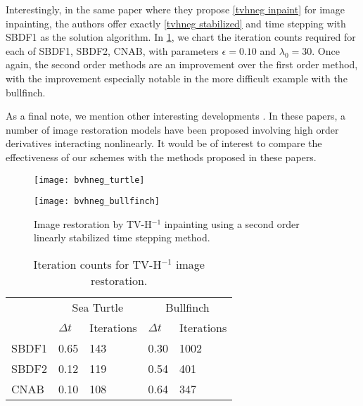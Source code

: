 Interestingly, in the same paper where they propose \cref{tvhneg inpaint} for image inpainting, the authors offer exactly \cref{tvhneg stabilized} and time stepping with SBDF1 as the solution algorithm. In \cref{tab:bvhneg iter counts}, we chart the iteration counts required for each of SBDF1, SBDF2, CNAB, with parameters $\epsilon=0.10$ and $\lambda_0=30$. Once again, the second order methods are an improvement over the first order method, with the improvement especially notable in the more difficult example with the bullfinch. 

As a final note, we mention other interesting developments \cite{bredies2010total,papafitsoros2014combined,papafitsoros2013combined}. In these papers, a number of image restoration models have been proposed involving high order derivatives interacting nonlinearly. It would be of interest to compare the effectiveness of our schemes with the methods proposed in these papers.

\begin{figure}[htb!]
	\centering
\begin{minipage}{0.65\textwidth}
	\texttt{[image: bvhneg\_turtle]}
\end{minipage}
\begin{minipage}{0.65\textwidth}
	\texttt{[image: bvhneg\_bullfinch]}
\end{minipage}
\caption[Image restoration by TV-H$^{-1}$ inpainting]{Image restoration by TV-H$^{-1}$ inpainting using a second order linearly stabilized time stepping method.}
\label{fig:bvhneg inpainting}
\end{figure}

\begin{table}[htb!]
\caption[Iteration counts for TV-H$^{-1}$ image restoration]{Iteration counts for TV-H$^{-1}$ image restoration.}
        \centering\begin{tabular}{lll ll} \toprule[1.25pt]
& \multicolumn{2}{c}{Sea Turtle} & \multicolumn{2}{c}{Bullfinch}
\\
& $\Delta t$ & Iterations & $\Delta t$ & Iterations
\\ \midrule
SBDF1 & 0.65 & 143 & 0.30 & 1002
\\
SBDF2& 0.12 & 119 & 0.54 & 401 
\\             
CNAB & 0.10 & 108 & 0.64 & 347
\\ \bottomrule[1.25pt]
\end{tabular}
\label{tab:bvhneg iter counts}
\end{table}


